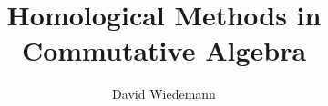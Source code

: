 
\title{Homological Methods in Commutative Algebra}
\author{David Wiedemann}
\date{}

\maketitle



